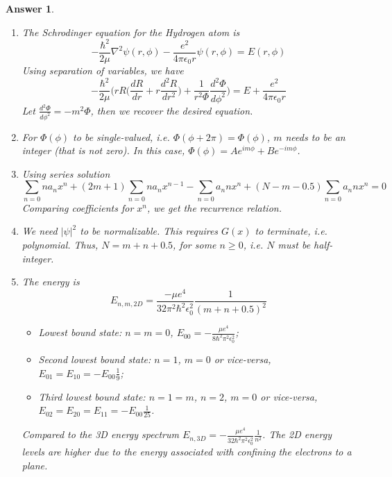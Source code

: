 \documentclass[a4paper]{article}
\newtheorem{ans}{Answer}[subsection]
\theoremstyle{new}
\begin{document}
\newpage
\begin{ans}\leavevmode
\begin{enumerate}[label=(\roman*)]
\item The Schrodinger equation for the Hydrogen atom is
$$-\frac{\hbar^2}{2\mu}\nabla^2\psi(r,\phi)-\frac{e^2}{4\pi\epsilon_0r}\psi(r,\phi)=E(r,\phi)$$
Using separation of variables, we have
$$-\frac{\hbar^2}{2\mu}\bigg(rR\bigg(\frac{dR}{dr}+r\frac{d^2R}{dr^2}\bigg)+\frac{1}{r^2\Phi}\frac{d^2\Phi}{d\phi^2}\bigg)=E+\frac{e^2}{4\pi\epsilon_0r}$$
Let $\frac{d^2\Phi}{d\phi^2}=-m^2\Phi$, then we recover the desired equation.
\item For $\Phi(\phi)$ to be single-valued, i.e. $\Phi(\phi+2\pi)=\Phi(\phi)$, $m$ needs to be an integer (that is not zero). In this case, $\Phi(\phi)=Ae^{im\phi}+Be^{-im\phi}$.
\item Using series solution
$$\sum_{n=0}na_nx^n+(2m+1)\sum_{n=0}na_nx^{n-1}-\sum_{n=0}a_nnx^n+(N-m-0.5)\sum_{n=0}a_nnx^n=0$$
Comparing coefficients for $x^n$, we get the recurrence relation.
\item We need $|\psi|^2$ to be normalizable. This requires $G(x)$ to terminate, i.e. polynomial. Thus, $N=m+n+0.5$, for some $n\geq0$, i.e. $N$ must be half-integer.
\item The energy is
$$E_{n,m,2D}=\frac{-\mu e^4}{32\pi^2\hbar^2\epsilon_0^2}\frac{1}{(m+n+0.5)^2}$$
\begin{itemize}
    \item Lowest bound state: $n=m=0$, $E_{00}=-\frac{\mu e^4}{8\hbar^2\pi^2\epsilon_0^2}$;
    \item Second lowest bound state: $n=1$, $m=0$ or vice-versa, $E_{01}=E_{10}=-E_{00}\frac{1}{9}$;
    \item Third lowest bound state: $n=1=m$, $n=2$, $m=0$ or vice-versa, $E_{02}=E_{20}=E_{11}=-E_{00}\frac{1}{25}$. 
\end{itemize}
Compared to the 3D energy spectrum $E_{n,3D}=-\frac{\mu e^4}{32\hbar^2\pi^2\epsilon_0^2}\frac{1}{n^2}$. The 2D energy levels are higher due to the energy associated with confining the electrons to a plane.
\end{enumerate}
\end{ans}
\newpage
\end{document}
